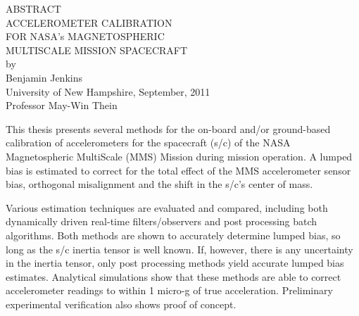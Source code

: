 
\pagebreak

\begin{center}
ABSTRACT
\vspace{0.9cm}\\
ACCELEROMETER CALIBRATION \\ FOR NASA's MAGNETOSPHERIC \\ MULTISCALE MISSION SPACECRAFT \\
\vspace{.4cm}
by\\
Benjamin Jenkins\\
University of New Hampshire, September, 2011\\
Professor May-Win Thein
\vspace{0.4cm}
\end{center}

This thesis presents several methods for the on-board and/or ground-based calibration of accelerometers for the spacecraft (s/c) of the NASA Magnetospheric MultiScale (MMS) Mission during mission operation. A lumped bias is estimated to correct for the total effect of the MMS accelerometer sensor bias, orthogonal misalignment and the shift in the s/c's center of mass.

Various estimation techniques are evaluated and compared, including both dynamically driven real-time filters/observers and post processing batch algorithms. Both methods are shown to accurately determine lumped bias, so long as the s/c inertia tensor is well known. If, however, there is any uncertainty in the inertia tensor, only post processing methods yield accurate lumped bias estimates. Analytical simulations show that these methods are able to correct accelerometer readings to within 1 micro-g of true acceleration. Preliminary experimental verification also shows proof of concept.



%
%




